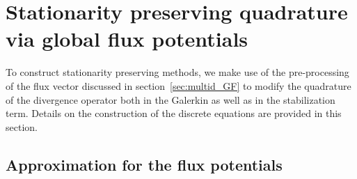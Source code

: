 \documentclass[a4paper,10pt]{article}
\begin{document}
  
 

\section{Stationarity preserving  quadrature via global flux potentials }\label{sec:stationarityGF}



To construct stationarity preserving methods, we make use of the pre-processing of the flux vector discussed in  section~\ref{sec:multid_GF} 
 to modify the quadrature of the divergence operator both in the Galerkin as well as  in the stabilization term.
Details on the construction of the discrete equations are provided in this section.

\subsection{Approximation for the flux potentials}
\end{document}
